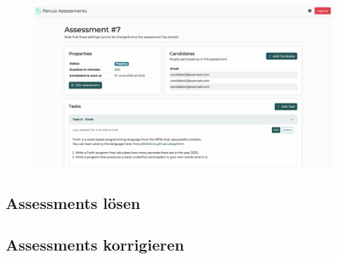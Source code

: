 \begin{figure}[H]
  \centering
  \includegraphics[width=14cm]{images/ui/assessments-edit.png}
  \caption{\label{fig:assessments-edit}}
\end{figure}

\subsection{Assessments lösen}

\subsection{Assessments korrigieren}
